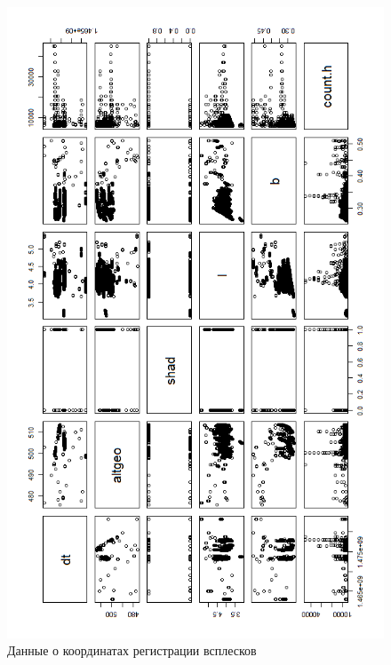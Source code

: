 \begin{figure}[h!]
	\centering
	\includegraphics[height=0.9\textheight]{images/Flash/Rplot08}
	\caption{Данные о координатах регистрации всплесков}
	\label{fig:rplot08}
\end{figure}

